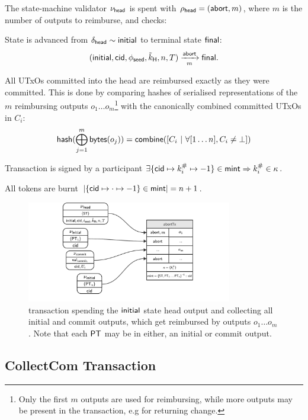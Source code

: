 \noindent The state-machine validator $\nu_\mathsf{head}$ is spent with
$\rho_{\mathsf{head}} = (\mathsf{abort}, m)$, where $m$ is the number of outputs to
reimburse, and checks:
\begin{menumerate}
	\item State is advanced from $\delta_{\mathsf{head}} \sim \mathsf{initial}$ to terminal state
	$\mathsf{final}$: %
	\[
		(\mathsf{initial},\mathsf{cid},\phi_{\mathsf{seed}},\tilde{k}_{\mathsf{H}},n,T) \xrightarrow[m]{\mathsf{abort}} \mathsf{final}.
	\]
	\item All UTxOs committed into the head are reimbursed exactly as they were
	committed. This is done by comparing hashes of serialised representations of
	the $m$ reimbursing outputs $o_{1} \dots o_{m}$\footnote{Only the first $m$
		outputs are used for reimbursing, while more outputs may be present in the
		transaction, e.g for returning change.} with the canonically combined
	committed UTxOs in $C_{i}$:
	\[
		\mathsf{hash}(\bigoplus_{j=1}^{m} \mathsf{bytes}(o_{j})) = \mathsf{combine}([C_{i} ~ | ~ \forall [1\dots n], C_{i} \neq \bot])
	\]

	\item Transaction is signed by a participant $\exists \{\mathsf{cid} \mapsto k^{\#}_{i} \mapsto -1\} \in \mathsf{mint} \Rightarrow k^{\#}_{i} \in \kappa$.
	\item All tokens are burnt
	$|\{\mathsf{cid} \mapsto \cdot \mapsto -1\} \in \mathsf{mint}| = n + 1$.
\end{menumerate}

\begin{figure}
	\centering
	\includegraphics[width=0.8\textwidth]{figures/abortTx.pdf}
	\caption{\mtxAbort{} transaction spending the $\mathsf{initial}$ state head
		output and collecting all initial and commit outputs, which get reimbursed
		by outputs $o_{1} \dots o_{m}$. Note that each $\mathsf{PT}$ may be in either, an
		initial or commit output.}\label{fig:abortTx}
\end{figure}

\subsection{CollectCom Transaction}\label{sec:collect-tx}

